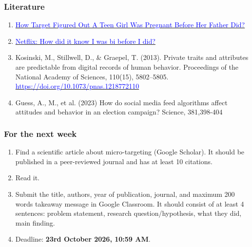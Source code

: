 \documentclass[aspectratio=169]{beamer}
\begin{document}
\begin{frame}
    \frametitle{Literature}
    \scriptsize
    \begin{enumerate}
        \item \href{https://www.forbes.com/sites/kashmirhill/2012/02/16/how-target-figured-out-a-teen-girl-was-pregnant-before-her-father-did/?sh=1333c4646668}{\textcolor{blue}{How Target Figured Out A Teen Girl Was Pregnant Before Her Father Did?}}
        \item \href{https://www.bbc.com/news/technology-66472938}{\textcolor{blue}{Netflix: How did it know I was bi before I did?}}
        \item Kosinski, M., Stillwell, D., \& Graepel, T. (2013). Private traits and attributes are predictable from digital records of human behavior. Proceedings of the National Academy of Sciences, 110(15), 5802–5805. \href{https://doi.org/10.1073/pnas.1218772110}{\textcolor{blue}{https://doi.org/10.1073/pnas.1218772110}}
        \item Guess, A., M., et al. (2023) How do social media feed algorithms affect attitudes and behavior in an election campaign? Science, 381,398-404 \href{https://doi.org/10.1126/science.abp9364}{\color{blue}{https://doi.org/10.1126/science.abp9364}}
    \end{enumerate}
\end{frame}

\begin{frame}
    \frametitle{For the next week}
    \begin{enumerate}
        \item Find a scientific article about micro-targeting (Google Scholar). It should be published in a peer-reviewed journal and has at least 10 citations.
        \item Read it.
        \item Submit the title, authors, year of publication, journal, and maximum 200 words takeaway message in Google Classroom. It should consist of at least 4 sentences: problem statement, research question/hypothesis, what they did, main finding.
        \item Deadline: \textbf{23rd October 2026, 10:59 AM}.
    \end{enumerate}
\end{frame}
\end{document}
